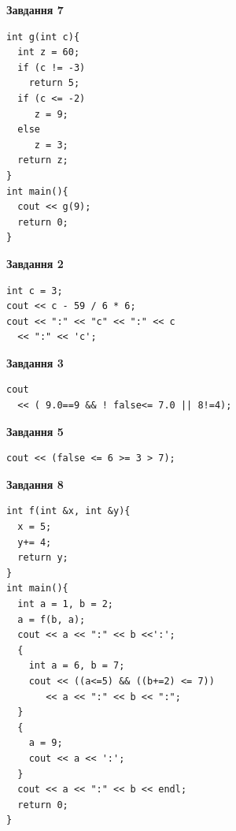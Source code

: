 \documentclass[12pt, ukrainian]{article}
\begin{document}
{\begin {large}
\begin{minipage}[t]{7.0cm}
\begin{center}
\textbf{Завдання 7}
\end{center}
\vspace{-8mm}

\begin{verbatim}
int g(int c){
  int z = 60;
  if (c != -3)
    return 5;
  if (c <= -2)
     z = 9;
  else
     z = 3;
  return z;
}
int main(){
  cout << g(9);
  return 0;
}
\end{verbatim}

\end{minipage}
\vline \hspace{1mm}
\begin{minipage}[t]{11.0cm}

\begin{center}
\textbf{Завдання 2}
\end{center}
\vspace{-8mm}

\begin{verbatim}
int c = 3;
cout << c - 59 / 6 * 6;
cout << ":" << "c" << ":" << c 
  << ":" << 'c';
\end{verbatim}



\begin{center}
\textbf{Завдання 3}
\end{center}
\vspace{-8mm}

\begin{verbatim}
cout 
  << ( 9.0==9 && ! false<= 7.0 || 8!=4);
\end{verbatim}



\begin{center}
\textbf{Завдання 5}
\end{center}
\vspace{-8mm}

\begin{verbatim}
cout << (false <= 6 >= 3 > 7);
\end{verbatim}



\begin{center}
\textbf{Завдання 8}
\end{center}
\vspace{-8mm}

\begin{verbatim}
int f(int &x, int &y){
  x = 5;
  y+= 4;
  return y;
}
int main(){
  int a = 1, b = 2;
  a = f(b, a);
  cout << a << ":" << b <<':';
  {
    int a = 6, b = 7;
    cout << ((a<=5) && ((b+=2) <= 7))
       << a << ":" << b << ":";
  }
  {
    a = 9;
    cout << a << ':';
  }
  cout << a << ":" << b << endl;
  return 0;
}
\end{verbatim}


\end{minipage}
\end{large}}
\end{document}
